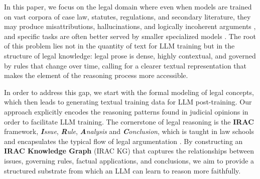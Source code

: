 In this paper, we focus on the legal domain where even when models are trained on vast corpora of case law, statutes, regulations, and secondary literature, they may produce misattributions, hallucinations, and logically incoherent arguments \cite{doi.org/10.1111/jels.12413}, and specific tasks are often better served by smaller specialized models \cite{DBLP:journals/corr/abs-2304-12202,jayakumar-etal-2023-large,DBLP:conf/cikm/ShuZLDDZ24}. The root of this problem lies not in the quantity of text for LLM training but in the structure of legal knowledge: legal prose is dense, highly contextual, and governed by rules that change over time, calling for a clearer textual representation that makes the element of the reasoning process more accessible.

In order to address this gap, we start with the formal modeling of legal concepts, which then leads to generating textual training data for LLM post-training. Our approach explicitly encodes the reasoning patterns found in judicial opinions in order to facilitate LLM training. The cornerstone of legal reasoning is the \textbf{IRAC} framework, \textit{\textbf{I}ssue}, \textit{\textbf{R}ule}, \textit{\textbf{A}nalysis} and \textit{\textbf{C}onclusion}, which is taught in law schools and encapsulates the typical flow of legal argumentation \cite{brand1976legalwriting}. By constructing an \textbf{IRAC Knowledge Graph} (IRAC KG) that captures the relationships between issues, governing rules, factual applications, and conclusions, we aim to provide a structured substrate from which an LLM can learn to reason more faithfully. 

